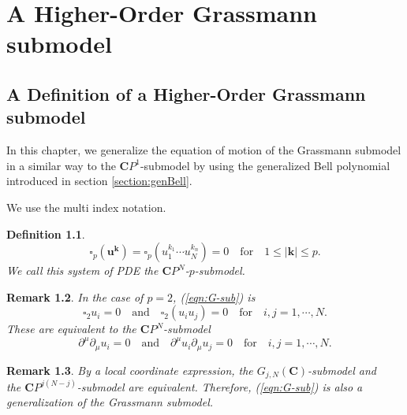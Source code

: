 \documentclass[makeidx,12pt,openany]{report}
\newtheorem{df}{Definition}[chapter]
\newtheorem{rmk}[df]{Remark}
\begin{document}
\chapter{A Higher-Order Grassmann submodel}
\section{A Definition of a Higher-Order Grassmann submodel}
In this chapter, we generalize the equation of motion of 
the Grassmann submodel in a similar way to the ${\mathbf{C}}P^1$-submodel 
by using the generalized Bell polynomial introduced in section 
\ref{section:genBell}. 

We use the multi index notation. 
\begin{df}
\begin{equation}
 \square_p ({\mathbf{u}}^{\mathbf{k}})=
 \square_p (u_1^{k_1} \cdots u_N^{k_n})=0
 \quad \mbox{for} \quad 1 \le |{\mathbf{k}}| \le p . 
 \label{eqn:G-sub}
\end{equation}
We call this system of PDE 
{\it{the ${\mathbf{C}}P^N$-$p$-submodel}}. 
\end{df}
\begin{rmk}
In the case of $p=2$, (\ref{eqn:G-sub}) is
$$
 \square_2 u_i =0 
 \quad \mbox{and} \quad 
 \square_2 (u_i u_j)=0 \quad \mbox{for} \quad i,j=1,\cdots,N. 
$$
These are equivalent to the ${\mathbf{C}}P^N$-submodel
$$
 \partial^{\mu}\partial_{\mu}u_i=0 \quad \mbox{and} \quad 
 \partial^{\mu}u_i \partial_{\mu}u_j=0
 \quad \mbox{for} \quad i,j=1,\cdots,N. 
$$
\end{rmk}
\begin{rmk}
By a local coordinate expression, the $G_{j,N}({\mathbf{C}})$-submodel 
and \\ the ${\mathbf{C}}P^{j(N-j)}$-submodel are equivalent. Therefore, 
(\ref{eqn:G-sub}) is also a generalization of the Grassmann submodel. 
\end{rmk}
\end{document}
